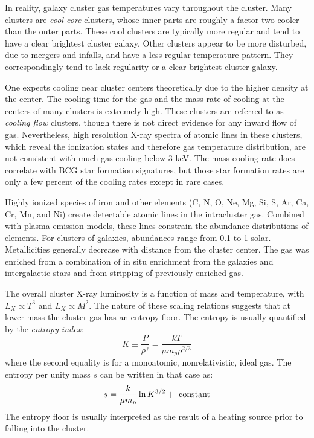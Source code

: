 In reality, galaxy cluster gas temperatures vary throughout the
cluster. Many clusters are {\it cool core} clusters, whose inner parts
are roughly a factor two cooler than the outer parts. These cool
clusters are typically more regular and tend to have a clear brightest
cluster galaxy. Other clusters appear to be more disturbed, due to
mergers and infalls, and have a less regular temperature pattern. They
correspondingly tend to lack regularity or a clear brightest cluster
galaxy.

One expects cooling near cluster centers theoretically due to the
higher density at the center. The cooling time for the gas and the
mass rate of cooling at the centers of many clusters is extremely
high. These clusters are referred to as {\it cooling flow} clusters,
though there is not direct evidence for any inward flow of gas.
Nevertheless, high resolution X-ray spectra of atomic lines in these
clusters, which reveal the ionization states and therefore gas
temperature distribution, are not consistent with much gas cooling
below 3 keV. The mass cooling rate does correlate with BCG star
formation signatures, but those star formation rates are only a few
percent of the cooling rates except in rare cases.

Highly ionized species of iron and other elements (C, N, O, Ne, Mg,
Si, S, Ar, Ca, Cr, Mn, and Ni) create detectable atomic lines in the
intracluster gas. Combined with plasma emission models, these lines
constrain the abundance distributions of elements. For clusters of
galaxies, abundances range from 0.1 to 1 solar. Metallicities
generally decrease with distance from the cluster center. The gas was
enriched from a combination of in situ enrichment from the galaxies
and intergalactic stars and from stripping of previously enriched
gas. 

The overall cluster X-ray luminosity is a function of mass and
temperature, with $L_X\propto T^3$ and $L_X\propto M^2$. The nature of
these scaling relations suggests that at lower mass the cluster gas
has an entropy floor. The entropy is usually quantified by the {\it
entropy index}:
\begin{equation}
K\equiv \frac{P}{\rho^\gamma} = \frac{kT}{\mu m_p \rho^{2/3}}
\end{equation}
where the second equality is for a monoatomic, nonrelativistic, ideal
gas. The entropy per unity mass $s$ can be written in that case as:
\begin{equation}
\label{eq:entropy}
s = \frac{k}{\mu m_p} \ln K^{3/2} + {\rm ~constant}
\end{equation}
The entropy floor is usually interpreted as the result of a heating
source prior to falling into the cluster.

